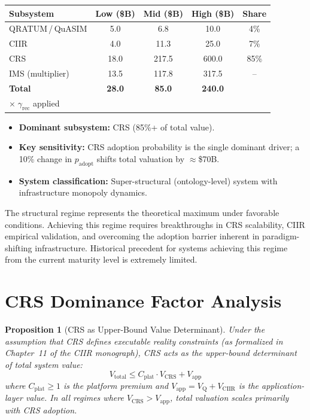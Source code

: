 \documentclass[11pt,a4paper]{article}
\newtheorem{proposition}[definition]{Proposition}
\theoremstyle{remark}
\newcommand{\VQ}{V_{\mathrm{Q}}}
\newcommand{\VCIIR}{V_{\mathrm{CIIR}}}
\newcommand{\VCRS}{V_{\mathrm{CRS}}}
\newcommand{\Vtot}{V_{\mathrm{total}}}
\newcommand{\speculative}[1]{\textcolor{red!70!black}{#1}}
\begin{document}
\begin{center}
\renewcommand{\arraystretch}{1.3}
\begin{tabular}{lcccc}
\toprule
\textbf{Subsystem} & \textbf{Low (\$B)} & \textbf{Mid (\$B)} & \textbf{High (\$B)} & \textbf{Share} \\
\midrule
QRATUM\,/\,QuASIM & 5.0   & 6.8   & 10.0  & 4\%   \\
CIIR               & 4.0   & 11.3  & 25.0  & 7\%   \\
CRS                & 18.0  & 217.5 & 600.0 & 85\%  \\
IMS (multiplier)   & 13.5  & 117.8 & 317.5 & --    \\
\midrule
\textbf{Total}     & \textbf{28.0} & \textbf{85.0} & \textbf{240.0} & \\
$\times\;\gamma_{\mathrm{rec}}$ applied & & & & \\
\bottomrule
\end{tabular}
\end{center}

\begin{itemize}[nosep]
  \item \textbf{Dominant subsystem:} CRS (85\%+ of total value).
  \item \textbf{Key sensitivity:} CRS adoption probability is the
        single dominant driver; a 10\% change in $p_{\mathrm{adopt}}$
        shifts total valuation by $\approx$\$70B.
  \item \textbf{System classification:} Super-structural
        (ontology-level) system with infrastructure monopoly dynamics.
\end{itemize}

\speculative{The structural regime represents the theoretical
maximum under favorable conditions.  Achieving this regime requires
breakthroughs in CRS scalability, CIIR empirical validation, and
overcoming the adoption barrier inherent in paradigm-shifting
infrastructure.  Historical precedent for systems achieving this
regime from the current maturity level is extremely limited.}


\section{CRS Dominance Factor Analysis}
\label{sec:crs_dominance}

\begin{proposition}[CRS as Upper-Bound Value Determinant]
\label{prop:crs_dominance}
Under the assumption that CRS defines executable reality constraints
(as formalized in Chapter~11 of the CIIR monograph), CRS acts as the
\emph{upper-bound determinant} of total system value:
\begin{equation}
  \Vtot \leq C_{\mathrm{plat}} \cdot \VCRS + V_{\mathrm{app}}
  \label{eq:crs_bound}
\end{equation}
where $C_{\mathrm{plat}} \geq 1$ is the platform premium and
$V_{\mathrm{app}} = \VQ + \VCIIR$ is the application-layer value.
In all regimes where $\VCRS > V_{\mathrm{app}}$, total valuation
scales primarily with CRS adoption.
\end{proposition}
\end{document}
